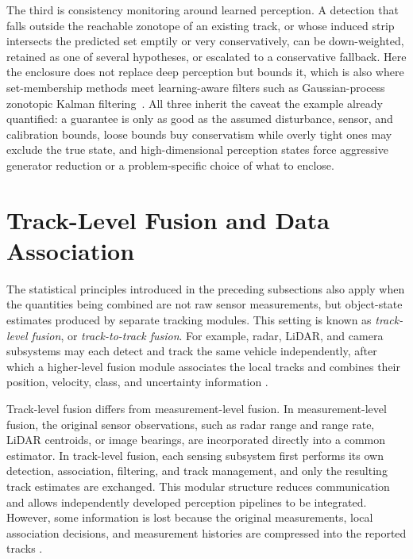 The third is consistency monitoring around learned perception. A detection that
falls outside the reachable zonotope of an existing track, or whose induced strip
intersects the predicted set emptily or very conservatively, can be down-weighted,
retained as one of several hypotheses, or escalated to a conservative fallback.
Here the enclosure does not replace deep perception but bounds it, which is also
where set-membership methods meet learning-aware filters such as Gaussian-process
zonotopic Kalman filtering~\cite{li2022_gp_zkf}. All three inherit the caveat
the example already quantified: a guarantee is only as good as the assumed
disturbance, sensor, and calibration bounds, loose bounds buy conservatism while
overly tight ones may exclude the true state, and high-dimensional perception
states force aggressive generator reduction or a problem-specific choice of what
to enclose.


%
\section{Track-Level Fusion and Data Association}
\label{sec:track-level}
\label{subsec:track-fusion}
%

The statistical principles introduced in the preceding subsections also apply when the quantities being combined are not raw sensor measurements, but object-state estimates produced by separate tracking modules. This setting is known as \emph{track-level fusion}, or \emph{track-to-track fusion}. For example, radar, LiDAR, and camera subsystems may each detect and track the same vehicle independently, after which a higher-level fusion module associates the local tracks and combines their position, velocity, class, and uncertainty information \cite{liggins_handbook_2009,khaleghi_multisensor_2013,
barshalom1995multitarget,barshalom2011tracking}.

Track-level fusion differs from measurement-level fusion. In
measurement-level fusion, the original sensor observations, such as radar range and range rate, LiDAR centroids, or image bearings, are incorporated directly into a common estimator. In track-level fusion, each sensing subsystem first performs its own detection, association, filtering, and track management, and only the resulting track estimates are exchanged. This modular structure reduces communication and allows independently developed perception pipelines to be integrated. However, some information
is lost because the original measurements, local association decisions, and measurement histories are compressed into the reported tracks \cite{blackman1999design,barshalom2011tracking}.

